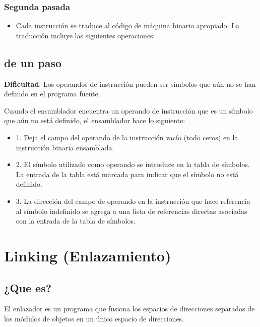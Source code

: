 \documentclass[11pt]{article}
\begin{document}
\subsubsection*{Segunda pasada}
\label{sec:org927358b}
\begin{itemize}
\item Cada instrucción se traduce al código de máquina binario apropiado. La traducción incluye las siguientes operaciones:
\end{itemize}


\subsection{de un paso}
\label{sec:org017a1ea}
\textbf{Dificultad}: Los operandos de instrucción pueden ser símbolos que aún no se han definido en el programa fuente.

Cuando el ensamblador encuentra un operando de instrucción que es un símbolo que aún no está definido, el ensamblador hace lo siguiente:

\begin{itemize}
\item 1. Deja el campo del operando de la instrucción vacío (todo ceros) en la instrucción binaria ensamblada.

\item 2. El símbolo utilizado como operando se introduce en la tabla de símbolos. La entrada de la tabla está marcada para indicar que el símbolo no está definido.

\item 3. La dirección del campo de operando en la instrucción que hace referencia al símbolo indefinido se agrega a una lista de referencias directas asociadas con la entrada de la tabla de símbolos.
\end{itemize}

\section{Linking (Enlazamiento)}
\label{sec:orgb2fef1b}
\subsection{¿Que es?}
\label{sec:org44ceff5}
El enlazador es un programa que fusiona los espacios de direcciones separados de los módulos de objetos en un único espacio de direcciones.
\end{document}
